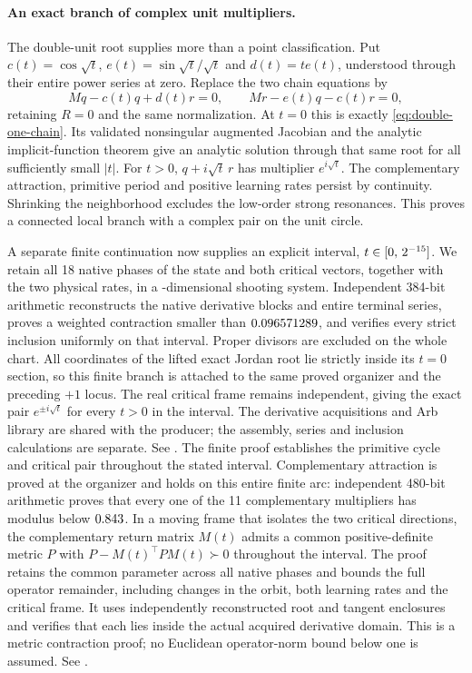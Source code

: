 \documentclass[11pt,letterpaper]{article}
\begin{document}
\paragraph{An exact branch of complex unit multipliers.}
The double-unit root supplies more than a point classification. Put
$c(t)=\cos\sqrt{t}$, $e(t)=\sin\sqrt{t}/\sqrt{t}$ and $d(t)=t e(t)$, understood
through their entire power series at zero. Replace the two chain equations by
\begin{equation}
Mq-c(t)q+d(t)r=0,\qquad Mr-e(t)q-c(t)r=0,
\end{equation}
retaining $R=0$ and the same normalization. At $t=0$ this is exactly
\eqref{eq:double-one-chain}. Its validated nonsingular augmented Jacobian
and the analytic implicit-function theorem give an analytic solution through
that same root for all sufficiently small $|t|$. For $t>0$,
$q+i\sqrt{t}\,r$ has multiplier $e^{i\sqrt{t}}$.
The complementary attraction, primitive period and positive learning rates
persist by continuity. Shrinking the neighborhood excludes the low-order
strong resonances. This proves a connected local branch with a complex pair
on the unit circle.

A separate finite continuation now supplies an explicit interval,
$t\in[0,\,2^{-15}]$. We retain all 18 native phases of the state and
both critical vectors, together with the two physical rates, in a
\nFiniteUnitUnknowns-dimensional shooting system. Independent 384-bit
arithmetic reconstructs the native derivative blocks and entire terminal
series, proves a weighted contraction smaller than
$0.096571289$, and verifies every strict inclusion uniformly on
that interval. Proper divisors are excluded on the whole chart. All
\nFiniteUnitUnknowns{} coordinates of the lifted exact Jordan root lie
strictly inside its $t=0$ section, so this finite branch is attached to the
same proved organizer and the preceding $+1$ locus. The real critical frame
remains independent, giving the exact pair $e^{\pm i\sqrt t}$ for every
$t>0$ in the interval. The derivative acquisitions and Arb library are shared
with the producer; the assembly, series and inclusion calculations are
separate. See .
The finite proof establishes the primitive cycle and critical pair throughout
the stated interval. Complementary attraction is proved at the organizer and
holds on this entire finite arc: independent 480-bit arithmetic proves that every one of the
11 complementary multipliers has modulus below $0.843$. In a moving frame
that isolates the two critical directions, the complementary return matrix $M(t)$ admits a
common positive-definite metric $P$ with $P-M(t)^\top P M(t)\succ0$ throughout the interval.
The proof retains the common parameter across all native phases and bounds the full operator
remainder, including changes in the orbit, both learning rates and the critical frame.
It uses independently reconstructed root and tangent enclosures and verifies that each lies
inside the actual acquired derivative domain. This is a metric contraction proof; no Euclidean
operator-norm bound below one is assumed. See
.
\end{document}
